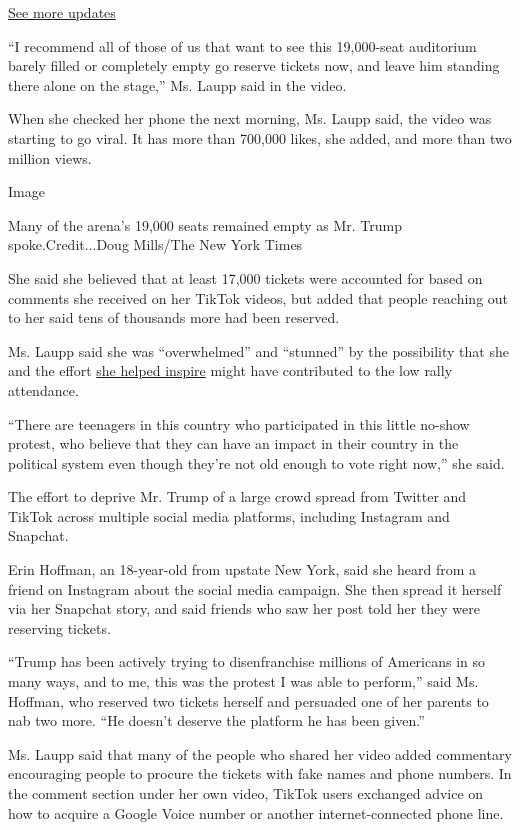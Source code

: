 \href{https://www.nytimes3xbfgragh.onion/2020/07/31/us/elections/biden-vs-trump.html?action=click\&pgtype=Article\&state=default\&region=MAIN_CONTENT_1\&context=storylines_live_updates}{See
more updates}

``I recommend all of those of us that want to see this 19,000-seat
auditorium barely filled or completely empty go reserve tickets now, and
leave him standing there alone on the stage,'' Ms. Laupp said in the
video.

When she checked her phone the next morning, Ms. Laupp said, the video
was starting to go viral. It has more than 700,000 likes, she added, and
more than two million views.

Image

Many of the arena's 19,000 seats remained empty as Mr. Trump
spoke.Credit...Doug Mills/The New York Times

She said she believed that at least 17,000 tickets were accounted for
based on comments she received on her TikTok videos, but added that
people reaching out to her said tens of thousands more had been
reserved.

Ms. Laupp said she was ``overwhelmed'' and ``stunned'' by the
possibility that she and the effort
\href{https://www.tiktok.com/@maryjolaupp/video/6840619115585998085}{she
helped inspire} might have contributed to the low rally attendance.

``There are teenagers in this country who participated in this little
no-show protest, who believe that they can have an impact in their
country in the political system even though they're not old enough to
vote right now,'' she said.

The effort to deprive Mr. Trump of a large crowd spread from Twitter and
TikTok across multiple social media platforms, including Instagram and
Snapchat.

Erin Hoffman, an 18-year-old from upstate New York, said she heard from
a friend on Instagram about the social media campaign. She then spread
it herself via her Snapchat story, and said friends who saw her post
told her they were reserving tickets.

``Trump has been actively trying to disenfranchise millions of Americans
in so many ways, and to me, this was the protest I was able to
perform,'' said Ms. Hoffman, who reserved two tickets herself and
persuaded one of her parents to nab two more. ``He doesn't deserve the
platform he has been given.''

Ms. Laupp said that many of the people who shared her video added
commentary encouraging people to procure the tickets with fake names and
phone numbers. In the comment section under her own video, TikTok users
exchanged advice on how to acquire a Google Voice number or another
internet-connected phone line.

